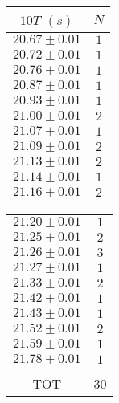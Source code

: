 \documentclass[12pt, a4paper]{article}
\begin{document}
\begin{table}[!htb]
    \begin{minipage}[t]{.5\linewidth}
    \centering
        \begin{tabular}{|c|c|}
            \hline
            $10T$ $(s)$&$N$\\
            \hline
            $20.67\pm 0.01$ & $1$\\
            $20.72\pm 0.01$ & $1$\\
            $20.76\pm 0.01$ & $1$\\
            $20.87\pm 0.01$ & $1$\\
            $20.93\pm 0.01$ & $1$\\
            $21.00\pm 0.01$ & $2$\\
            $21.07\pm 0.01$ & $1$\\
            $21.09\pm 0.01$ & $2$\\
            $21.13\pm 0.01$ & $2$\\
            $21.14\pm 0.01$ & $1$\\
            $21.16\pm 0.01$ & $2$\\
            \hline
        \end{tabular}
    \end{minipage}
    \begin{minipage}[t]{.5\linewidth}
    \centering
        \begin{tabular}{|c|c|}
            \hline
            
            $21.20\pm 0.01$ & $1$\\
            $21.25\pm 0.01$ & $2$\\
            $21.26\pm 0.01$ & $3$\\
            $21.27\pm 0.01$ & $1$\\
            $21.33\pm 0.01$ & $2$\\
            $21.42\pm 0.01$ & $1$\\
            $21.43\pm 0.01$ & $1$\\
            $21.52\pm 0.01$ & $2$\\
            $21.59\pm 0.01$ & $1$\\
            $21.78\pm 0.01$ & $1$\\
            &\\
            \hline
            \hline
            TOT & 30\\
            \hline
        \end{tabular}
        \label{TAB:1}
    \end{minipage} 
\end{table}
\end{document}
